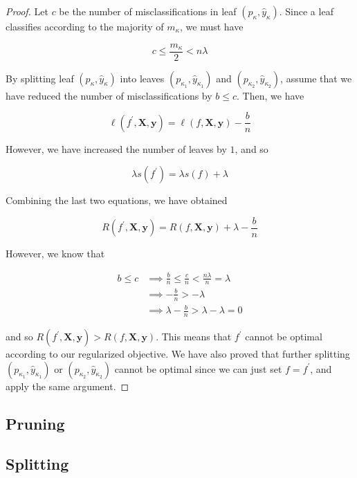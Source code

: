   \begin{proof}
  Let $c$ be the number of misclassifications in leaf $(p_{\kappa}, \hat{y}_{\kappa})$. Since a leaf classifies according to the majority of $m_{\kappa}$, we must have 

    \begin{equation}
      c \leq \frac{m_\kappa}{2} < n \lambda
    \end{equation}

  By splitting leaf $(p_\kappa, \hat{y}_\kappa)$ into leaves $(p_{\kappa_1}, \hat{y}_{\kappa_1})$ and $(p_{\kappa_2}, \hat{y}_{\kappa_2})$, assume that we have reduced the number of misclassifications by $b \leq c$. Then, we have 

    \begin{equation}
      \ell(f^\prime, \mathbf{X}, \mathbf{y}) = \ell(f, \mathbf{X}, \mathbf{y}) - \frac{b}{n}
    \end{equation}

  However, we have increased the number of leaves by $1$, and so 

    \begin{equation}
      \lambda s(f^\prime) = \lambda s(f) + \lambda
    \end{equation}

  Combining the last two equations, we have obtained 

    \begin{equation}
      R (f^\prime, \mathbf{X}, \mathbf{y}) = R(f, \mathbf{X}, \mathbf{y}) + \lambda - \frac{b}{n}
    \end{equation}

  However, we know that 

  \begin{align*}
    b \leq c & \implies \frac{b}{n} \leq \frac{c}{n} < \frac{n \lambda}{n} = \lambda \\
    & \implies - \frac{b}{n} > - \lambda \\
    & \implies \lambda - \frac{b}{n} > \lambda - \lambda = 0
  \end{align*}

  and so $R (f^\prime, \mathbf{X}, \mathbf{y}) > R(f, \mathbf{X}, \mathbf{y})$. This means that $f^\prime$ cannot be optimal according to our regularized objective. We have also proved that further splitting $(p_{\kappa_1}, \hat{y}_{\kappa_1})$ or $(p_{\kappa_2}, \hat{y}_{\kappa_2})$ cannot  be optimal since we can just set $f = f^\prime$, and apply the same argument. 
  \end{proof}

\subsection{Pruning} 

\subsection{Splitting} 
